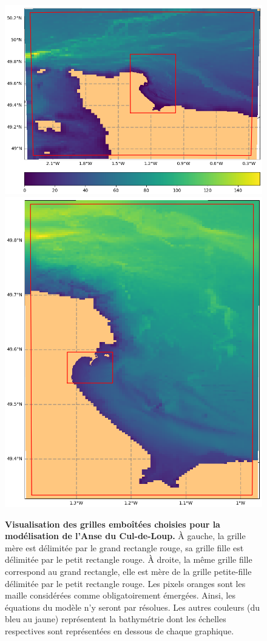 \documentclass[10pt,a4paper,titlepage]{article}
\begin{document}
\begin{figure}[h!]
    \centering
    \includegraphics[scale=0.4]{../images/croco_grd.nc.1_V2.png}
    \includegraphics[scale=0.27]{../images/croco_grd.nc.2_V2.png}
    \caption{
        \textbf{Visualisation des grilles emboîtées choisies pour la modélisation de l'Anse du Cul-de-Loup.}
        À gauche, la grille mère est délimitée par le grand rectangle rouge, sa grille fille est délimitée par le petit rectangle rouge.
        À droite, la même grille fille correspond au grand rectangle, elle est mère de la grille petite-fille délimitée par le petit rectangle rouge.
        Les pixels oranges sont les maille considérées comme obligatoirement émergées. Ainsi, les équations du modèle n'y seront par résolues.
        Les autres couleurs (du bleu au jaune) représentent la bathymétrie dont les échelles respectives sont représentées en dessous de chaque graphique.
    }
    \label{imbrication}
\end{figure}
\end{document}
